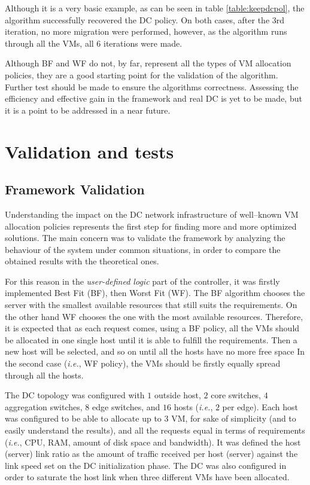 \documentclass[12pt,english,oneside]{book}
\begin{document}
Although it is a very basic example, as can be seen in table \ref{table:keepdcpol}, the algorithm successfully recovered the DC policy.
On both cases, after the $3$rd iteration, no more migration were performed, however, as the algorithm runs through all the VMs, all $6$ iterations were made.

Although BF and WF do not, by far, represent all the types of VM allocation policies, they are a good starting point for the validation of the algorithm.
Further test should be made to ensure the algorithms correctness.
Assessing the efficiency and effective gain in the framework and real DC is yet to be made, but it is a point to be addressed in a near future.

\chapter{Validation and tests \label{cha:valtes} }

\section{Framework Validation}

Understanding the impact on the DC network infrastructure of well--known VM allocation policies represents the first step for finding more and more optimized solutions. The main concern was to validate the framework by analyzing the behaviour of the system under common situations, in order to compare the obtained results with the theoretical ones.

For this reason in the \textit{user-defined logic} part of the controller, it was firstly implemented Best Fit (BF), then Worst Fit (WF).
The BF algorithm chooses the server with the smallest available resources that still suits the requirements.
On the other hand WF chooses the one with the most available resources.
Therefore, it is expected that as each request comes, using a BF policy, all the VMs should be allocated in one single host until it is able to fulfill the requirements.
Then a new host will be selected, and so on until all the hosts have no more free space
 In the second case (\textit{i.e.}, WF policy), the VMs should be firstly equally spread through all 
the hosts.

The DC topology was configured with $1$ outside host, $2$ core switches, $4$ aggregation switches, $8$ edge switches, and $16$ hosts (\textit{i.e.}, $2$ per edge). Each host was configured to be able to allocate up to $3$ VM, for sake of simplicity (and to easily understand the results), and all the requests equal in terms of requirements (\textit{i.e.}, CPU, RAM, amount of disk space and bandwidth). It was defined the host (server) link ratio as the amount of traffic received per host (server) against the link speed set on the DC initialization phase. The DC was also configured in order to saturate the host link when three different VMs have been allocated.
\end{document}
